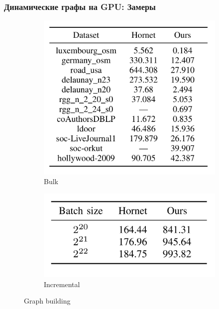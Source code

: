\documentclass[xcolor=table,english]{beamer}
\begin{document}
\begin{frame}[fragile] \frametitle{Динамические графы на GPU: Замеры}
    \begin{minipage}[m]{1.0\linewidth}
        \begin{figure}
            \centering
            \begin{subfigure}[b]{0.47\textwidth}
                \includegraphics[width=\textwidth]{pictures/bulk_build.png}
                \caption{Bulk}
            \end{subfigure}
            \hfill
            \begin{subfigure}[b]{0.47\textwidth}
                \includegraphics[width=\textwidth]{pictures/incremental_build.png}
                \caption{Incremental}
            \end{subfigure}
            \caption{Graph building}
        \end{figure}
    \end{minipage}\hfill
\end{frame}
\end{document}
